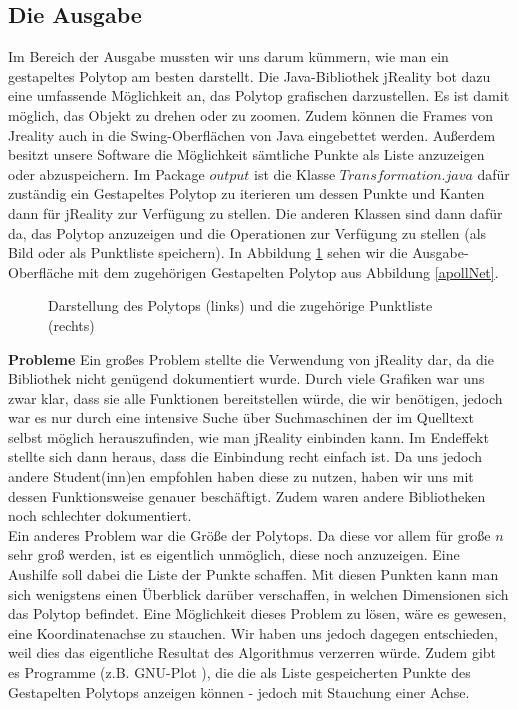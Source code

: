 \subsection*{Die Ausgabe}
Im Bereich der Ausgabe mussten wir uns darum kümmern, wie man ein gestapeltes Polytop am besten darstellt. Die Java-Bibliothek jReality bot dazu eine umfassende Möglichkeit an, das Polytop grafischen darzustellen. Es ist damit möglich, das Objekt zu drehen oder zu zoomen. Zudem können die Frames von Jreality auch in die Swing-Oberflächen von Java eingebettet werden. Außerdem besitzt unsere Software die Möglichkeit sämtliche Punkte als Liste anzuzeigen oder abzuspeichern. Im Package $output$ ist die Klasse $Transformation.java$ dafür zuständig ein Gestapeltes Polytop zu iterieren um dessen Punkte und Kanten dann für jReality zur Verfügung zu stellen. Die anderen Klassen sind dann dafür da, das Polytop anzuzeigen und die Operationen zur Verfügung zu stellen (als Bild oder als Punktliste speichern). In Abbildung \ref{polytop} sehen wir die Ausgabe-Oberfläche mit dem zugehörigen Gestapelten Polytop aus Abbildung \ref{apollNet}.\\

\begin{figure}[htbp]
	\centering
	\caption{Darstellung des Polytops (links) und die zugehörige Punktliste (rechts)}
	\label{polytop}
\end{figure}

\textbf{Probleme} Ein großes Problem stellte die Verwendung von jReality dar, da die Bibliothek nicht genügend dokumentiert wurde. Durch viele Grafiken war uns zwar klar, dass sie alle Funktionen bereitstellen würde, die wir benötigen, jedoch war es nur durch eine intensive Suche über Suchmaschinen der im Quelltext selbst möglich herauszufinden, wie man jReality einbinden kann. Im Endeffekt stellte sich dann heraus, dass die Einbindung recht einfach ist. Da uns jedoch andere Student(inn)en empfohlen haben diese zu nutzen, haben wir uns mit dessen Funktionsweise genauer beschäftigt. Zudem waren andere Bibliotheken noch schlechter dokumentiert.\\
Ein anderes Problem war die Größe der Polytops. Da diese vor allem für große $n$ sehr groß werden, ist es eigentlich unmöglich, diese noch anzuzeigen. Eine Aushilfe soll dabei die Liste der Punkte schaffen. Mit diesen Punkten kann man sich wenigstens einen Überblick darüber verschaffen, in welchen Dimensionen sich das Polytop befindet. Eine Möglichkeit dieses Problem zu lösen, wäre es gewesen, eine Koordinatenachse zu stauchen. Wir haben uns jedoch dagegen entschieden, weil dies das eigentliche Resultat des Algorithmus verzerren würde. Zudem gibt es Programme (z.B. GNU-Plot \cite{gnuplot}), die die als Liste gespeicherten Punkte des Gestapelten Polytops anzeigen können - jedoch mit Stauchung einer Achse.

